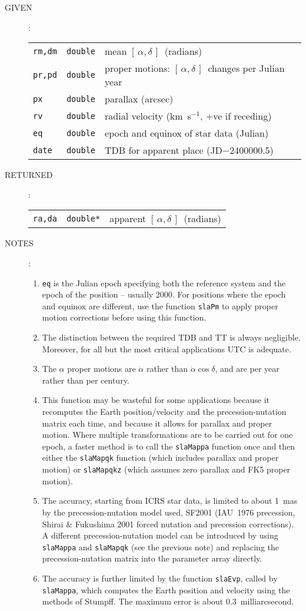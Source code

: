\documentclass[11pt,fleqn,twoside]{article}
\renewcommand{\_}{{\tt\char'137}}     %
\newcommand{\radec}     {$[\,\alpha,\delta\,]$}
\newlength{\oldspacing}
\newcommand{\args}[2]
{
  \goodbreak
  \setlength{\oldspacing}{\topsep}
  \setlength{\topsep}{0.3ex}
  \begin{description}
  \item[#1]:\\[1.5ex]
    \begin{tabular}{p{6.7em}p{6.8em}p{22em}}
      #2
    \end{tabular}
  \end{description}
  \setlength{\topsep}{\oldspacing}
}
\newcommand{\spec}[3]
{
  {\tt \mbox{#1}} & {\tt \mbox{#2}} & {#3}
}
\newcommand{\notes}[1]
{
  \goodbreak
  \setlength{\oldspacing}{\topsep}
  \setlength{\topsep}{0.3ex}
  \begin{description}
    \item[NOTES]:
        #1
  \end{description}
  \setlength{\topsep}{\oldspacing}
}
\begin{document}
\args{GIVEN}
{
 \spec{rm,dm}{double}{mean \radec\ (radians)} \\
 \spec{pr,pd}{double}{proper motions:  \radec\ changes per Julian year} \\
 \spec{px}{double}{parallax (arcsec)} \\
 \spec{rv}{double}{radial velocity (km~s$^{-1}$, +ve if receding)} \\
 \spec{eq}{double}{epoch and equinox of star data (Julian)} \\
 \spec{date}{double}{TDB for apparent place (JD$-$2400000.5)}
}
\args{RETURNED}
{
 \spec{ra,da}{double*}{apparent \radec\ (radians)}
}
\notes
{
 \begin{enumerate}
  \item {\tt eq} is the Julian epoch specifying both the reference
        system and the epoch of the position -- usually 2000.
        For positions where the epoch and equinox are
        different, use the function {\tt slaPm} to apply proper
        motion corrections before using this function.
  \item The distinction between the required TDB and TT is
        always negligible.  Moreover, for all but the most
        critical applications UTC is adequate.
  \item The $\alpha$ proper motions are $\dot{\alpha}$ rather than
        $\dot{\alpha}\cos\delta$, and are per year rather than per century.
  \item This function may be wasteful for some applications
        because it recomputes the Earth position/velocity and
        the precession-nutation matrix each time, and because
        it allows for parallax and proper motion.  Where
        multiple transformations are to be carried out for one
        epoch, a faster method is to call the {\tt slaMappa} function
        once and then either the {\tt slaMapqk} function (which includes
        parallax and proper motion) or {\tt slaMapqkz} (which assumes
        zero parallax and FK5 proper motion).
  \item The accuracy, starting from ICRS star data,
        is limited to about 1~mas by the
        precession-nutation model used, SF2001
        (IAU~1976 precession, Shirai \& Fukushima 2001 forced nutation and
        precession corrections).  A different precession-nutation model
        can be introduced by using {\tt slaMappa} and {\tt slaMapqk} (see
        the previous note) and replacing the precession-nutation
        matrix into the parameter array directly.
  \item The accuracy is further limited by the function {\tt slaEvp}, called
        by {\tt slaMappa}, which computes the Earth position and
        velocity using the methods of Stumpff.  The maximum
        error is about 0.3~milliarcsecond.
 \end{enumerate}
}
\end{document}
